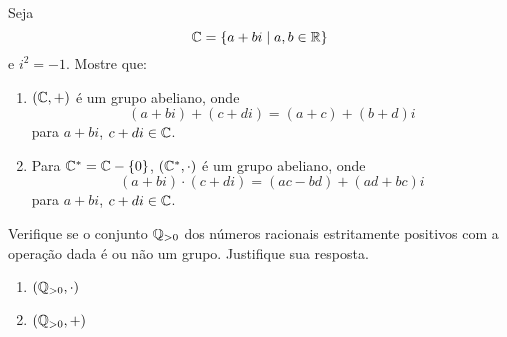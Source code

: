 \documentclass[12pt]{exam}
\begin{document}
\vspace{.3cm}

\questao{} Seja
\[
	\mathbb{C} = \{a + bi \mid a, b \in \mathbb{R}\}
\]
e $i^2 = -1$. Mostre que:
\begin{enumerate}[label=({\alph*})]
	\item $(\mathbb{C}, +)$ \'e um grupo abeliano, onde
	\[
		(a + bi) + (c + di) = (a + c) + (b + d)i 
	\]
	para $a + bi$, $c + di \in \mathbb{C}$.
	\item Para $\mathbb{C}^* = \mathbb{C} - \{0\}$, $(\mathbb{C}^*, \cdot)$ \'e um grupo abeliano, onde
	\[
		(a + bi)\cdot (c + di) = (ac - bd) + (ad + bc)i 
	\]
	para $a + bi$, $c + di \in \mathbb{C}$.
\end{enumerate}

\vspace{.3cm}

\questao{} Verifique se o conjunto $\mathbb{Q}_{>0}$ dos n{\'u}meros racionais estritamente positivos com a
 opera{\c c}{\~a}o dada {\'e} ou n{\~a}o um grupo. Justifique sua
resposta.
\begin{multicols}{2}
\begin{enumerate}[label=({\alph*})]
\item $(\mathbb{Q}_{>0},\cdot)$
\item $(\mathbb{Q}_{>0}, +)$
\end{enumerate}
\end{multicols}

\vspace{.3cm}



\end{document}
